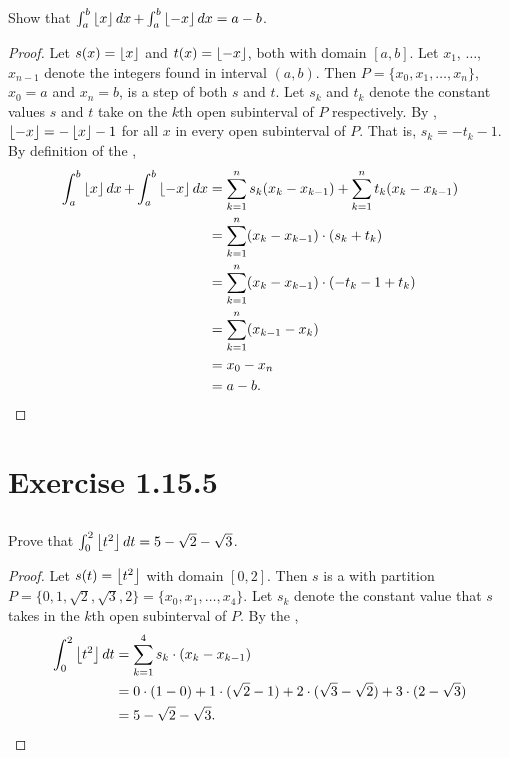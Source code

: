 \documentclass{report}
\begin{document}
Show that
  $\int_a^b \left\lfloor x\right\rfloor \mathop{dx} + \int_a^b \left\lfloor-x\right\rfloor \mathop{dx} = a - b$.

\begin{proof}

  Let $s(x) = \left\lfloor x\right\rfloor$ and $t(x) = \left\lfloor-x\right\rfloor$, both with domain $[a, b]$.
  Let $x_1$, $\ldots$, $x_{n-1}$ denote the integers found in interval $(a, b)$.
  Then $P = \{x_0, x_1, \ldots, x_n\}$, $x_0 = a$ and $x_n = b$, is a step
     of both $s$ and $t$.
  Let $s_k$ and $t_k$ denote the constant values $s$ and $t$ take on the $k$th
    open subinterval of $P$ respectively.
  By , $\left\lfloor-x\right\rfloor = -\left\lfloor x\right\rfloor - 1$ for all $x$
    in every open subinterval of $P$.
  That is, $s_k = -t_k - 1$.
  By definition of the ,
    \begin{align*}
      \int_a^b \left\lfloor x\right\rfloor \mathop{dx} + \int_a^b \left\lfloor-x\right\rfloor \mathop{dx}
        & = \sum_{k=1}^n s_k (x_k - x_{k-1}) +
            \sum_{k=1}^n t_k (x_k - x_{k-1}) \\
        & = \sum_{k=1}^n (x_k - x_{k-1}) \cdot (s_k + t_k) \\
        & = \sum_{k=1}^n (x_k - x_{k-1}) \cdot (-t_k - 1 + t_k) \\
        & = \sum_{k=1}^n (x_{k-1} - x_k) \\
        & = x_0 - x_n \\
        & = a - b.
    \end{align*}

\end{proof}

\section{Exercise 1.15.5}%
\label{sec:exercise-1.15.5}

\subsection{}%
\label{sub:exercise-1.15.5a}

Prove that $\int_0^2 \left\lfloor t^2\right\rfloor \mathop{dt} = 5 - \sqrt{2} - \sqrt{3}$.

\begin{proof}

  Let $s(t) = \left\lfloor t^2\right\rfloor$ with domain $[0, 2]$.
  Then $s$ is a  with partition
    $P = \{0, 1, \sqrt{2}, \sqrt{3}, 2\} = \{x_0, x_1, \ldots, x_4\}$.
  Let $s_k$ denote the constant value that $s$ takes in the $k$th open
    subinterval of $P$.
  By the ,
    \begin{align*}
      \int_0^2 \left\lfloor t^2\right\rfloor \mathop{dt}
        & = \sum_{k=1}^4 s_k \cdot (x_k - x_{k-1}) \\
        & = 0 \cdot (1 - 0) + 1 \cdot (\sqrt{2} - 1) +
            2 \cdot (\sqrt{3} - \sqrt{2}) + 3 \cdot (2 - \sqrt{3}) \\
        & = 5 - \sqrt{2} - \sqrt{3}.
    \end{align*}

\end{proof}
\end{document}
